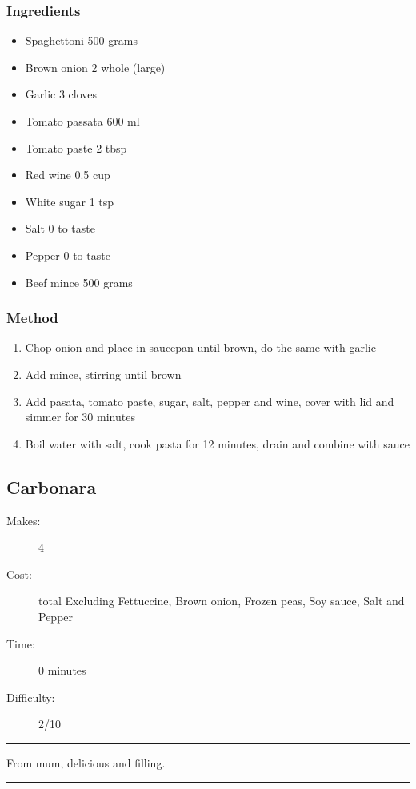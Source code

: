 \documentclass[]{article}
\begin{document}
\subsubsection*{\Large Ingredients}
\begin{multicols}{2}
\begin{itemize}
 \item Spaghettoni \hfill 500 grams
 \item Brown onion \hfill 2 whole (large)
 \item Garlic \hfill 3 cloves
 \item Tomato passata \hfill 600 ml
 \item Tomato paste \hfill 2 tbsp
 \item Red wine \hfill 0.5 cup
 \item White sugar \hfill 1 tsp
 \item Salt \hfill 0 to taste
 \item Pepper \hfill 0 to taste
 \item Beef mince \hfill 500 grams
\end{itemize}
\end{multicols}
\subsubsection*{\Large Method}
\begin{enumerate}[font=\huge\color{accent}]
	\item Chop onion and place in saucepan until brown, do the same with garlic
	\item Add mince, stirring until brown
	\item Add pasata, tomato paste, sugar, salt, pepper and wine, cover with lid and simmer for 30 minutes
	\item Boil water with salt, cook pasta for 12 minutes, drain and combine with sauce
\end{enumerate}
\newpage
{}\label{rec:Carbonara}
\subsection*{\center\huge Carbonara}
\begin{description}
\item[Makes:] 4 
\item[Cost:]  total Excluding Fettuccine, Brown onion, Frozen peas, Soy sauce, Salt and Pepper
\item[Time:] 0 minutes
\item[Difficulty:] 2/10
\end{description}
\vspace{0.2cm}\hrule\vspace{0.5cm}
\begin{adjustwidth}{0.5 cm}{0.5 cm}

From mum, delicious and filling. \hfill\color{accent}{\Large\faTruck\hspace{0.1cm}}\color{black}

\end{adjustwidth}
\vspace{0.5cm}\hrule
\end{document}
